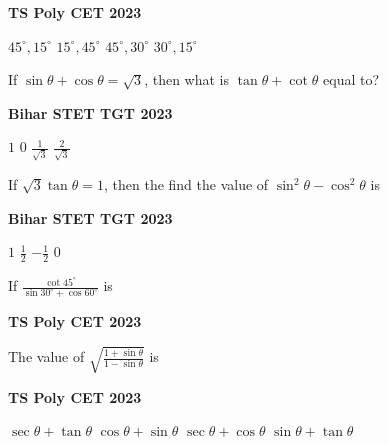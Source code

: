 \documentclass[11pt,paper=a4,answers]{exam}
\begin{document}
\begin{multicols}{2}
\begin{questions}
\begin{flushright}
\small\textbf{TS Poly CET 2023}
\end{flushright}


\begin{choices}
\choice $\displaystyle 45^{\circ}, 15^{\circ}$ 
\choice $\displaystyle 15^{\circ}, 45^{\circ}$ 
\choice $\displaystyle 45^{\circ}, 30^{\circ}$ 
\choice $\displaystyle 30^{\circ}, 15^{\circ}$ 
\end{choices}

\columnbreak
\question If $\sin \theta + \cos \theta = \sqrt{3}$, then what is  $\tan \theta + \cot \theta$ equal to?
\begin{flushright}
\small\textbf{Bihar STET TGT 2023}
\end{flushright}


\begin{choices}
\choice $\displaystyle 1$ 
\choice $\displaystyle 0$  
\choice $\displaystyle \frac{1}{\sqrt{3}}$  
\choice $\displaystyle \frac{2}{\sqrt{3}}$  
\end{choices}


\question If $\sqrt{3} \tan  \theta = 1$, then the find the value of $\sin^2 \theta  - \cos^2 \theta$ is
\begin{flushright}
\small\textbf{Bihar STET TGT 2023}
\end{flushright}


\begin{choices}
\choice $\displaystyle 1$ 
\choice $\displaystyle \frac{1}{2}$ 
\choice $\displaystyle - \frac{1}{2}$ 
\choice $\displaystyle 0$ 
\end{choices}

\question 
If $\displaystyle \frac{ \cot 45^{\circ} }{\sin 30^{\circ} + \cos 60^{\circ} } $ is
\begin{flushright}
\small\textbf{TS Poly CET 2023}
\end{flushright}
\begin{choices}
\end{choices}
\question The value of $\displaystyle \sqrt{\frac{1+ \sin \theta}{1-\sin \theta}}   $ is
\begin{flushright}
\small\textbf{TS Poly CET 2023}
\end{flushright}


\begin{choices}
\choice $\displaystyle \sec \theta + \tan \theta$
\choice $\displaystyle \cos \theta + \sin \theta$
\choice $\displaystyle \sec \theta + \cos \theta$ 
\choice $\displaystyle \sin \theta + \tan \theta$  
\end{choices}
\end{questions}
\end{multicols}
\end{document}
